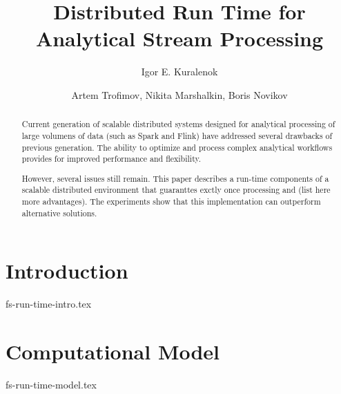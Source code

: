 \documentclass[sigconf]{style/acmart}
\begin{document}
\title {Distributed Run Time for Analytical Stream Processing}


\author{Igor E. Kuralenok}

\author{Artem Trofimov, Nikita Marshalkin, Boris Novikov}


\begin{abstract}
Current generation of scalable distributed systems designed for analytical processing of large volumens of data (such as  Spark and Flink) have addressed several drawbacks of previous generation. The ability to optimize and process complex analytical workflows  provides for improved performance and flexibility.

However, several issues still remain. This paper describes a run-time components of a scalable distributed environment that guaranttes exctly once  processing and (list here more advantages). The experiments show that this implementation can outperform alternative solutions.
\end {abstract}

\maketitle


\section {Introduction}
 {fs-run-time-intro.tex}

\section {Computational Model}
 {fs-run-time-model.tex}
\end{document}
